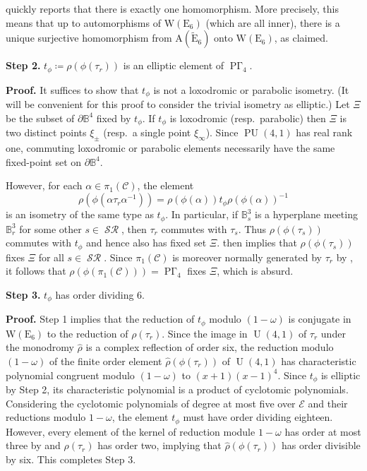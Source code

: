 \documentclass[11pt]{amsart}
\theoremstyle{plain}
\theoremstyle{definition}
\theoremstyle{remark}
\newcommand{\bbB}{\mathbb{B}}
\newcommand{\calC}{\mathcal{C}}
\newcommand{\calE}{\mathcal{E}}
\newcommand{\al}{\alpha}
\newcommand{\om}{\omega}
\DeclareMathOperator{\U}{U}
\DeclareMathOperator{\PU}{PU}
\DeclareMathOperator{\PGam}{\mathrm{P}\Gamma}
\DeclareMathOperator{\SR}{\mathcal{SR}}
\newcommand{\wh}{\widehat}
\begin{document}
\medskip

\noindent quickly reports that there is exactly one homomorphism. More precisely, this means that up to automorphisms of $\mathrm{W}(\mathrm{E}_6)$ (which are all inner), there is a unique surjective homomorphism from $\mathrm{A}(\widetilde{\mathrm{E}}_6)$ onto $\mathrm{W}(\mathrm{E}_6)$, as claimed.

\medskip
\noindent\textbf{Step 2.} $t_\phi \coloneqq \rho(\phi(\tau_r))$ is an elliptic element of $\PGam_4$.

\medskip
\noindent
\textbf{Proof.} It suffices to show that $t_\phi$ is not a loxodromic or parabolic isometry. (It will be convenient for this proof to consider the trivial isometry as elliptic.) Let $\Xi$ be the subset of $\partial \bbB^4$ fixed by $t_\phi$. If $t_\phi$ is loxodromic (resp.\ parabolic) then $\Xi$ is two distinct points $\xi_\pm$ (resp.\ a single point $\xi_\infty$). Since $\PU(4,1)$ has real rank one, commuting loxodromic or parabolic elements necessarily have the same fixed-point set on $\partial \bbB^4$.

However, for each $\al \in \pi_1(\calC)$, the element 
\[
\rho(\phi(\al \tau_r \al^{-1})) = \rho(\phi(\al)) t_\phi \rho(\phi(\al))^{-1}
\]
is an isometry of the same type as $t_\phi$. In particular, if $\bbB^3_s$ is a hyperplane meeting $\bbB^3_r$ for some other $s \in \SR$, then $\tau_r$ commutes with $\tau_s$. Thus $\rho(\phi(\tau_s))$ commutes with $t_\phi$ and hence also has fixed set $\Xi$.  then implies that $\rho(\phi(\tau_s))$ fixes $\Xi$ for all $s \in \SR$. Since $\pi_1(\calC)$ is moreover normally generated by $\tau_r$ by , it follows that $\rho(\phi(\pi_1(\calC))) = \PGam_4$ fixes $\Xi$, which is absurd.

\medskip
\noindent\textbf{Step 3.} $t_\phi$ has order dividing $6$.

\medskip
\noindent
\textbf{Proof.} Step 1 implies that the reduction of $t_\phi$ modulo $(1 - \om)$ is conjugate in $\mathrm{W}(\mathrm{E}_6)$ to the reduction of $\rho(\tau_r)$. Since the image in $\U(4,1)$ of $\tau_r$ under the monodromy $\wh{\rho}$ is a complex reflection of order six, the reduction modulo $(1 - \om)$ of the finite order element $\wh{\rho}(\phi(\tau_r))$ of $\U(4,1)$ has characteristic polynomial congruent modulo $(1 - \omega)$ to $(x+1)(x - 1)^4$. Since $t_\phi$ is elliptic by Step 2, its characteristic polynomial is a product of cyclotomic polynomials. Considering the cyclotomic polynomials of degree at most five over $\calE$ and their reductions modulo $1 - \om$, the element $t_\phi$ must have order dividing eighteen. However, every element of the kernel of reduction module $1 - \om$ has order at most three by \cite[Lem.\ 7.27]{ACT} and $\rho(\tau_r)$ has order two, implying that $\wh{\rho}(\phi(\tau_r))$ has order divisible by six. This completes Step 3.
\end{document}
